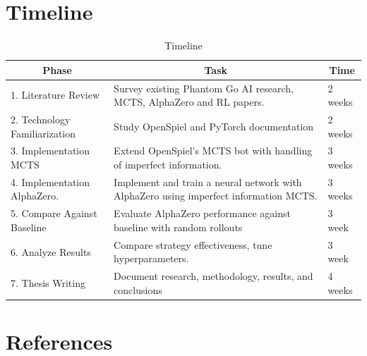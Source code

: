 \documentclass[12pt,oneside,openright]{article}
\begin{document}
\section{Timeline}

\begin{table}[H]
    \caption{Timeline}
    \centering
    \begin{tabularx}{\textwidth}{X|X|l}
        \toprule
        \multicolumn{1}{c}{Phase}     &
        \multicolumn{1}{c}{Task}      &
        \multicolumn{1}{c}{Time}                                                                                                        \\
        \midrule
        1. Literature Review          & Survey existing Phantom Go AI research, MCTS, AlphaZero and RL papers.                & 2 weeks \\
        \hline
        2. Technology Familiarization & Study OpenSpiel and PyTorch documentation                                             & 2 weeks \\
        \hline
        3. Implementation MCTS        & Extend OpenSpiel's MCTS bot with handling of imperfect information.                   & 3 weeks \\
        \hline
        4. Implementation AlphaZero.  & Implement and train a neural network with AlphaZero using imperfect information MCTS. & 3 weeks \\
        \hline
        5. Compare Against Baseline   & Evaluate AlphaZero performance against baseline with random rollouts                  & 3 week  \\
        \hline
        6. Analyze Results            & Compare strategy effectiveness, tune hyperparameters.                                 & 3 week  \\
        \hline
        7. Thesis Writing             & Document research, methodology, results, and conclusions                              & 4 weeks \\
        \hline
    \end{tabularx}
    \label{tab:timeline}
\end{table}


\section{References}
\printbibliography[heading=none]
\end{document}
